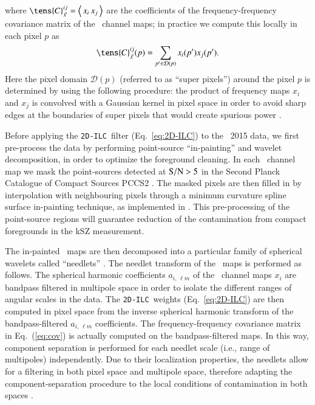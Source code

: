\documentclass[traditabstract, longauth]{aa}
\newcommand{\twodilc}{{\tt 2D-ILC}}
\newcommand{\1}{\'\i }
\begin{document}
where $\tens{C}_{\vec{x}}^{i j} = \left<\,x_{i}\, x_{j}\,\right>$
are the coefficients of the frequency-frequency covariance matrix of the
\Planck\ channel maps; in practice we compute this locally in each pixel $p$ as
\begin{eqnarray}\label{eq:cov}
  \tens{C}_{\vec{x}}^{i j}(p) = \sum_{p'\in \mathcal{D}(p)}
  x_i(p')x_j(p').
\end{eqnarray}
Here the pixel domain $\mathcal{D}(p)$ (referred to as ``super pixels'') around
the pixel $p$ is determined by using the following procedure: the product of
frequency maps $x_{i}$ and $x_{j}$ is convolved with a Gaussian kernel in pixel
space in order to avoid sharp edges at the boundaries of super pixels that
would create spurious
power \citep[][]{2012MNRAS.419.1163B,2013MNRAS.430..370R}.

Before applying the \twodilc\ filter (Eq.~\eqref{eq:2D-ILC}) to the
\Planck\ 2015 data, we first pre-process the data by performing point-source
``in-painting'' and wavelet decomposition, in order to optimize the foreground
cleaning. In each \Planck\ channel map we mask the point-sources detected
at ${\rm S/N}>5$ in the Second Planck Catalogue of Compact Sources PCCS2
\citep{planck2014-a35}. The masked pixels are then filled in by interpolation
with neighbouring pixels through a minimum curvature spline surface in-painting
technique, as implemented in \citet{2015MNRAS.451.4311R}. This pre-processing
of the point-source regions will guarantee reduction of the contamination from
compact foregrounds in the kSZ measurement.

The in-painted \Planck\ maps are then decomposed into a particular family
of spherical wavelets called ``needlets'' \citep[see,
e.g.,][]{Narcowich2006,Guilloux2007}. The needlet transform of the \Planck\
maps is performed as follows. The spherical harmonic coefficients ${a_{i,\,\ell
m}}$ of the \Planck\ channel maps $x_i$ are bandpass filtered in multipole
space in order to isolate the different ranges of angular scales in the data.
The \twodilc\ weights (Eq.~\eqref{eq:2D-ILC}) are then computed in pixel space
from the inverse spherical harmonic transform of the bandpass-filtered
${a_{i,\,\ell m}}$ coefficients. The frequency-frequency covariance matrix in
Eq.~(\ref{eq:cov}) is actually computed on the bandpass-filtered maps. In this
way, component separation is performed for each needlet scale (i.e., range of
multipoles) independently. Due to their localization properties, the needlets
allow for a filtering in both pixel space and multipole space,
therefore adapting the component-separation procedure to the local conditions
of contamination in both spaces
\citep[see][]{2009A&A.493.835D,2011MNRAS.418..467R,
2012MNRAS.419.1163B,2013MNRAS.430..370R}.
\end{document}
